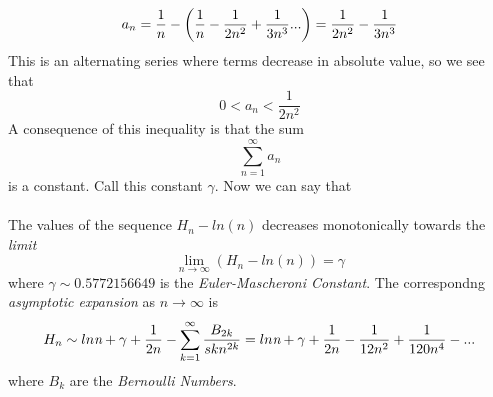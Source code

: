 \documentclass[2pt]{article}
\begin{document}
\begin{equation}
a_{n} = \frac{1}{n} - \bigg{(}\frac{1}{n} -\frac{1}{2n^2}+\frac{1}{3n^3}...\bigg{)}=\frac{1}{2n^2}-\frac{1}{3n^3}
\end{equation}
This is an alternating series where terms decrease in absolute value, so we see that
\begin{equation}
0<a_n<\frac{1}{2n^2}
\end{equation}
A consequence of this inequality is that the sum 
\begin{equation}
\sum_{n=1}^{\infty} a_n
\end{equation}
is a constant. Call this constant $\gamma$. Now we can say that
\\\\
The values of the sequence $H_{n} - ln(n)$ decreases monotonically towards the \emph{limit}
\begin{equation}
\lim_{n \to \infty} (H_{n} - ln(n)) = \gamma\nonumber
\end{equation}
where $\gamma \sim 0.5772156649$ is the \emph{Euler-Mascheroni Constant}. The correspondng \emph{asymptotic expansion} as $n \to \infty$ is
\begin{equation}
H_{n} \sim ln \emph{n} + \gamma + \frac{1}{2n}-\sum_{k=1}^{\infty} \frac{B_{2k}}{skn^{2k}}=ln \emph{n} + \gamma + \frac{1}{2n} - \frac{1}{12n^2}+\frac{1}{120n^4}-...\nonumber
\end{equation}
where $B_{k}$ are the \emph{Bernoulli Numbers}.
\end{document}
